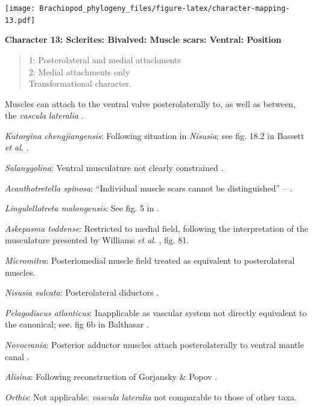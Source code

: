 \documentclass[openany]{book}
\theoremstyle{definition}
\theoremstyle{definition}
\theoremstyle{definition}
\theoremstyle{remark}
\begin{document}
\texttt{[image: Brachiopod\_phylogeny\_files/figure-latex/character-mapping-13.pdf]}

\textbf{Character 13: Sclerites: Bivalved: Muscle scars: Ventral:
Position}

\begin{quote}
1: Posterolateral and medial attachments\\
2: Medial attachments only\\
Transformational character.
\end{quote}

Muscles can attach to the ventral valve posterolaterally to, as well as
between, the \emph{vascula} \emph{lateralia}
\citep{Popov1992TheCambrian}.

\emph{Kutorgina chengjiangensis}: Following situation in \emph{Nisusia};
see fig. 18.2 in Bassett \emph{et al}.
\citeyearpar{Bassett2001Functionalmorphology}.

\emph{Salanygolina}: Ventral musculature not clearly constrained
\citep{Holmer2009Theenigmatic}.

\emph{Acanthotretella spinosa}: ``Individual muscle scars cannot be
distinguished'' -- \citet{Holmer2006Aspinose}.

\emph{Lingulellotreta malongensis}: See fig. 5 in
\citet{Holmer1997EarlyCambrian}.

\emph{Askepasma toddense}: Restricted to medial field, following the
interpretation of the musculature presented by Williams \emph{et al}.
\citeyearpar{Williams2000BrachiopodaLinguliformea}, fig. 81.

\emph{Micromitra}: Posteriomedial muscle field \citep[text-fig.
6]{Williams1998Thediversity} treated as equivalent to posterolateral
muscles.

\emph{Nisusia sulcata}: Posterolateral diductors \citep[fig. 18.2
in][]{Bassett2001Functionalmorphology}.

\emph{Pelagodiscus atlanticus}: Inapplicable as vascular system not
directly equivalent to the canonical; see. fig 6b in Balthasar
\citeyearpar{Balthasar2009Thebrachiopod}.

\emph{Novocrania}: Posterior adductor muscles attach posterolaterally to
ventral mantle canal \citep{Robinson2014Themuscles}.

\emph{Alisina}: Following reconstruction of Gorjansky \& Popov
\citeyearpar{Gorjansky1986Onthe}.

\emph{Orthis}: Not applicable: \emph{vascula} \emph{lateralia} not
comparable to those of other taxa.
\end{document}
